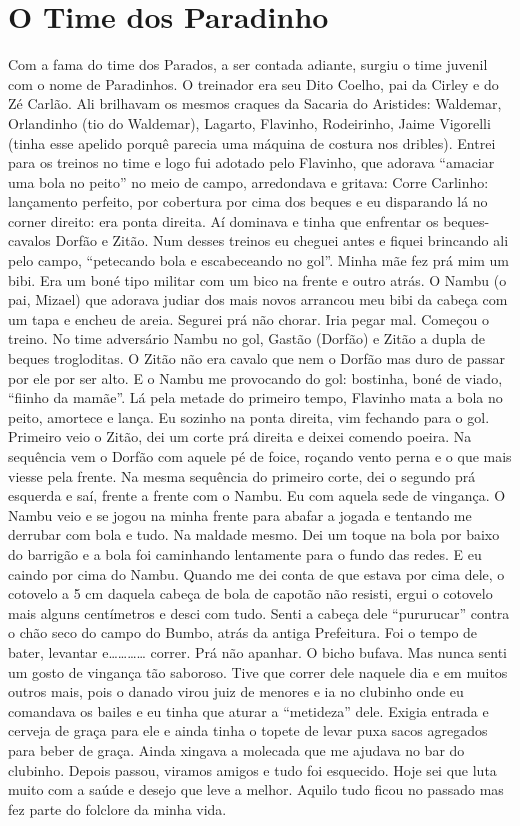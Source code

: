 \documentclass[12pt,brazil,]{book}
\begin{document}
\section{O Time dos Paradinho}\label{o-time-dos-paradinho}

Com a fama do time dos Parados, a ser contada adiante, surgiu o time
juvenil com o nome de Paradinhos. O treinador era seu Dito Coelho, pai
da Cirley e do Zé Carlão. Ali brilhavam os mesmos craques da Sacaria do
Aristides: Waldemar, Orlandinho (tio do Waldemar), Lagarto, Flavinho,
Rodeirinho, Jaime Vigorelli (tinha esse apelido porquê parecia uma
máquina de costura nos dribles). Entrei para os treinos no time e logo
fui adotado pelo Flavinho, que adorava ``amaciar uma bola no peito'' no
meio de campo, arredondava e gritava: Corre Carlinho: lançamento
perfeito, por cobertura por cima dos beques e eu disparando lá no corner
direito: era ponta direita. Aí dominava e tinha que enfrentar os
beques-cavalos Dorfão e Zitão. Num desses treinos eu cheguei antes e
fiquei brincando ali pelo campo, ``petecando bola e escabeceando no
gol''. Minha mãe fez prá mim um bibi. Era um boné tipo militar com um
bico na frente e outro atrás. O Nambu (o pai, Mizael) que adorava judiar
dos mais novos arrancou meu bibi da cabeça com um tapa e encheu de
areia. Segurei prá não chorar. Iria pegar mal. Começou o treino. No time
adversário Nambu no gol, Gastão (Dorfão) e Zitão a dupla de beques
trogloditas. O Zitão não era cavalo que nem o Dorfão mas duro de passar
por ele por ser alto. E o Nambu me provocando do gol: bostinha, boné de
viado, ``fiinho da mamãe''. Lá pela metade do primeiro tempo, Flavinho
mata a bola no peito, amortece e lança. Eu sozinho na ponta direita, vim
fechando para o gol. Primeiro veio o Zitão, dei um corte prá direita e
deixei comendo poeira. Na sequência vem o Dorfão com aquele pé de foice,
roçando vento perna e o que mais viesse pela frente. Na mesma sequência
do primeiro corte, dei o segundo prá esquerda e saí, frente a frente com
o Nambu. Eu com aquela sede de vingança. O Nambu veio e se jogou na
minha frente para abafar a jogada e tentando me derrubar com bola e
tudo. Na maldade mesmo. Dei um toque na bola por baixo do barrigão e a
bola foi caminhando lentamente para o fundo das redes. E eu caindo por
cima do Nambu. Quando me dei conta de que estava por cima dele, o
cotovelo a 5 cm daquela cabeça de bola de capotão não resisti, ergui o
cotovelo mais alguns centímetros e desci com tudo. Senti a cabeça dele
``pururucar'' contra o chão seco do campo do Bumbo, atrás da antiga
Prefeitura. Foi o tempo de bater, levantar
e\ldots{}\ldots{}\ldots{}\ldots{} correr. Prá não apanhar. O bicho
bufava. Mas nunca senti um gosto de vingança tão saboroso. Tive que
correr dele naquele dia e em muitos outros mais, pois o danado virou
juiz de menores e ia no clubinho onde eu comandava os bailes e eu tinha
que aturar a ``metideza'' dele. Exigia entrada e cerveja de graça para
ele e ainda tinha o topete de levar puxa sacos agregados para beber de
graça. Ainda xingava a molecada que me ajudava no bar do clubinho.
Depois passou, viramos amigos e tudo foi esquecido. Hoje sei que luta
muito com a saúde e desejo que leve a melhor. Aquilo tudo ficou no
passado mas fez parte do folclore da minha vida.
\end{document}
